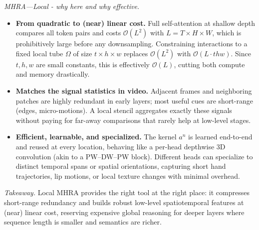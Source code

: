 \begin{enrichment}
\begin{enrichment}
        \newpage
        
        \emph{MHRA—Local - why here and why effective.}
        \begin{itemize}
            \item \textbf{From quadratic to (near) linear cost.} Full self-attention at shallow depth compares all token pairs and costs \(\mathcal{O}(L^2)\) with \(L=T\!\times\!H\!\times\!W\), which is prohibitively large before any downsampling. Constraining interactions to a fixed local tube \(\Omega\) of size \(t\!\times\!h\!\times\!w\) replaces \(\mathcal{O}(L^2)\) with \(\mathcal{O}(L\cdot thw)\). Since \(t,h,w\) are small constants, this is effectively \(\mathcal{O}(L)\), cutting both compute and memory drastically.            
            \item \textbf{Matches the signal statistics in video.} Adjacent frames and neighboring patches are highly redundant in early layers; most useful cues are short-range (edges, micro-motions). A local stencil aggregates exactly these signals without paying for far-away comparisons that rarely help at low-level stages.
            \item \textbf{Efficient, learnable, and specialized.} The kernel \(a^{n}\) is learned end-to-end and reused at every location, behaving like a per-head depthwise 3D convolution (akin to a PW–DW–PW block). Different heads can specialize to distinct temporal spans or spatial orientations, capturing short hand trajectories, lip motions, or local texture changes with minimal overhead.
        \end{itemize}
        
        \noindent
        \emph{Takeaway.} Local MHRA provides the right tool at the right place: it compresses short-range redundancy and builds robust low-level spatiotemporal features at (near) linear cost, reserving expensive global reasoning for deeper layers where sequence length is smaller and semantics are richer.
        

\end{enrichment}
\end{enrichment}
